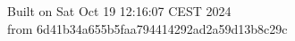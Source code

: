 {\noindent Built on Sat Oct 19 12:16:07 CEST 2024} \\ 
 {\noindent from 6d41b34a655b5faa794414292ad2a59d13b8c29c}
